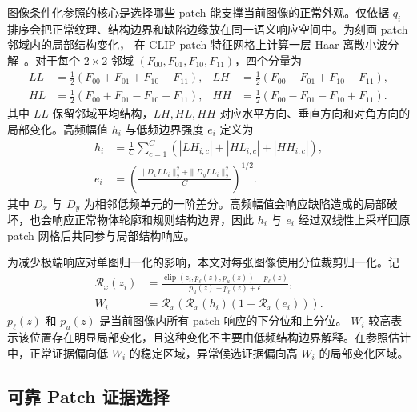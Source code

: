 图像条件化参照的核心是选择哪些 patch 能支撑当前图像的正常外观。仅依据 $q_i$ 排序会把正常纹理、结构边界和缺陷边缘放在同一语义响应空间中。为刻画 patch 邻域内的局部结构变化，\method{} 在 CLIP patch 特征网格上计算一层 Haar 离散小波分解~\cite{daubechies1988orthonormal,mallat1989theory}。对于每个 $2\times2$ 邻域
$(F_{00},F_{01},F_{10},F_{11})$，四个分量为
\begin{equation}
\begin{aligned}
  LL &= \tfrac{1}{2}(F_{00}+F_{01}+F_{10}+F_{11}),&
  LH &= \tfrac{1}{2}(F_{00}-F_{01}+F_{10}-F_{11}),\\
  HL &= \tfrac{1}{2}(F_{00}+F_{01}-F_{10}-F_{11}),&
  HH &= \tfrac{1}{2}(F_{00}-F_{01}-F_{10}+F_{11}).
\end{aligned}
\label{eq:haar-components}
\end{equation}
其中 $LL$ 保留邻域平均结构，$LH,HL,HH$ 对应水平方向、垂直方向和对角方向的局部变化。高频幅值 $h_i$ 与低频边界强度 $e_i$ 定义为
\begin{equation}
\begin{aligned}
  h_i &=
  \frac{1}{C}\sum_{c=1}^{C}\left(|LH_{i,c}|+|HL_{i,c}|+|HH_{i,c}|\right),\\
  e_i &=
  \left(\frac{\|D_xLL_i\|_2^2+\|D_yLL_i\|_2^2}{C}\right)^{1/2}.
\end{aligned}
\label{eq:structural-statistics}
\end{equation}
其中 $D_x$ 与 $D_y$ 为相邻低频单元的一阶差分。高频幅值会响应缺陷造成的局部破坏，也会响应正常物体轮廓和规则结构边界，因此 $h_i$ 与 $e_i$ 经过双线性上采样回原 patch 网格后共同参与局部结构响应。

为减少极端响应对单图归一化的影响，本文对每张图像使用分位裁剪归一化。记
\begin{equation}
\begin{aligned}
  \mathcal{R}_x(z_i)
  &=\frac{\operatorname{clip}(z_i,p_{\ell}(z),p_u(z))-p_{\ell}(z)}
          {p_u(z)-p_{\ell}(z)+\epsilon},\\
  W_i
  &=\mathcal{R}_x\!\left(\mathcal{R}_x(h_i)\left(1-\mathcal{R}_x(e_i)\right)\right).
\end{aligned}
\label{eq:structural-response}
\end{equation}
$p_{\ell}(z)$ 和 $p_u(z)$ 是当前图像内所有 patch 响应的下分位和上分位。
$W_i$ 较高表示该位置存在明显局部变化，且这种变化不主要由低频结构边界解释。在参照估计中，正常证据偏向低 $W_i$ 的稳定区域，异常候选证据偏向高 $W_i$ 的局部变化区域。

\subsection{可靠 Patch 证据选择}

